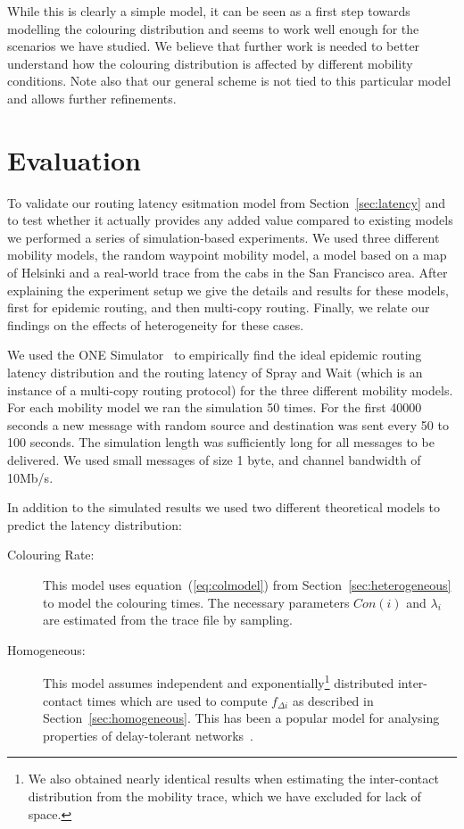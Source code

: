 \documentclass{article}
\begin{document}
While this is clearly a simple model, it can be seen as a first step
towards modelling the colouring distribution and seems to work well
enough for the scenarios we have studied. We believe that further work
is needed to better understand how the colouring distribution is
affected by different mobility conditions. Note also that our general
scheme is not tied to this particular model and allows further
refinements.
    
\section{Evaluation}
\label{sec:evaluation}

To validate our routing latency esitmation model from Section~\ref{sec:latency} and to test whether it actually provides any
added value compared to existing models we performed a series of
simulation-based experiments. We used three different mobility models,
the random waypoint mobility model, a model based on a map of Helsinki
and a real-world trace from the cabs in the San Francisco area. After
explaining the experiment setup we give the details and results for
these models, first for epidemic routing, and then multi-copy
routing. Finally, we relate our findings on the effects of
heterogeneity for these cases.

We used the ONE Simulator~\cite{keranen09a} to empirically find the
ideal epidemic routing latency distribution and the routing latency of
Spray and Wait (which is an instance of a multi-copy routing
protocol) for the three different mobility models. For each mobility
model we ran the simulation 50 times. For the first 40000 seconds a
new message with random source and destination was sent every 50 to
100 seconds. The simulation length was sufficiently long for all
messages to be delivered. We used small messages of size 1 byte, and
channel bandwidth of 10Mb/s.

In addition to the simulated results we used two different
theoretical models to predict the latency distribution:

\begin{description}
\item[Colouring Rate:] This model uses equation~(\ref{eq:colmodel}) from
  Section~\ref{sec:heterogeneous} to model the colouring times. The
  necessary parameters $Con(i)$ and $\lambda_i$ are estimated from the
  trace file by sampling.
\item[Homogeneous:] This model assumes independent and
  exponentially\footnote{We also obtained nearly identical results
    when estimating the inter-contact distribution from the mobility
    trace, which we have excluded for lack of space.} distributed
  inter-contact times which are used to compute $f_{\Delta i}$ as
  described in Section~\ref{sec:homogeneous}. This has been a popular
  model for analysing properties of delay-tolerant
  networks~\cite{resta11,spyropoulos08,zhang07}.
\end{description}
\end{document}

